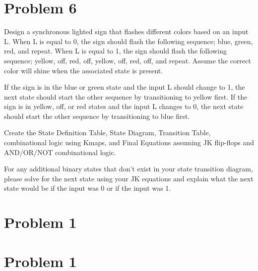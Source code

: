 \documentclass{article}
\begin{document}

    \section*{Problem 6}

    Design a synchronous lighted sign that flashes different colors based on an input L. 
    When L is equal to 0, the sign should flash the following sequence; blue, green, red, 
    and repeat. When L is equal to 1, the sign should flash the following sequence; yellow,
    off, red, off, yellow, off, red, off, and repeat. Assume the correct color will shine 
    when the associated state is present.

    If the sign is in the blue or green state and the input L should change to 1, the next 
    state should start the other sequence by transitioning to yellow first. If the sign is 
    in yellow, off, or red states and the input L changes to 0, the next state should start 
    the other sequence by transitioning to blue first.

    Create the State Definition Table, State Diagram, Transition Table, combinational logic 
    using Kmaps, and Final Equations assuming JK flip-flops and AND/OR/NOT combinational 
    logic.

    For any additional binary states that don't exist in your state transition diagram, 
    please solve for the next state using your JK equations and explain what the next state 
    would be if the input was 0 or if the input was 1.


    \section*{Problem 1}

    \section*{Problem 1}
\end{document}
